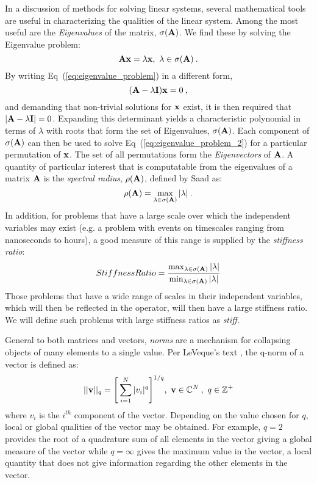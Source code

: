 In a discussion of methods for solving linear systems, several
mathematical tools are useful in characterizing the qualities of the
linear system. Among the most useful are the \textit{Eigenvalues} of
the matrix, $\sigma(\mathbf{A})$. We find these by solving the Eigenvalue
problem:
\begin{equation}
  \mathbf{A} \mathbf{x} = \lambda \mathbf{x},\ \lambda \in \sigma(\mathbf{A})\:.
  \label{eq:eigenvalue_problem}
\end{equation}
By writing Eq~(\ref{eq:eigenvalue_problem}) in a different form,
\begin{equation}
  (\mathbf{A} - \lambda \mathbf{I})\mathbf{x} = 0 \:,
  \label{eq:eigenvalue_problem_2}
\end{equation}
and demanding that non-trivial solutions for $\mathbf{x}$ exist, it is
then required that $|\mathbf{A} - \lambda \mathbf{I}| = 0$. Expanding this
determinant yields a characteristic polynomial in terms of $\lambda$
with roots that form the set of Eigenvalues, $\sigma(\mathbf{A})$. Each
component of $\sigma(\mathbf{A})$ can then be used to solve
Eq~(\ref{eq:eigenvalue_problem_2}) for a particular permutation of
$\mathbf{x}$. The set of all permutations form the \textit{Eigenvectors}
of $\mathbf{A}$. A quantity of particular interest that is computatable
from the eigenvalues of a matrix $\mathbf{A}$ is the \textit{spectral
  radius}, $\rho(\mathbf{A})$, defined by Saad \citep{saad_iterative_2003}
as:
\begin{equation}
  \rho(\mathbf{A}) = \max_{\lambda \in \sigma(\mathbf{A})} |\lambda| \:.
  \label{eq:spectral_radius}
\end{equation}
In addition, for problems that have a large scale over which the
independent variables may exist (e.g. a problem with events on
timescales ranging from nanoseconds to hours), a good measure of this
range is supplied by the \textit{stiffness ratio}:
\begin{equation}
  Stiffness Ratio = \frac{\max_{\lambda \in \sigma(\mathbf{A})}
    |\lambda|}{\min_{\lambda \in \sigma(\mathbf{A})} |\lambda|}
\end{equation}
Those problems that have a wide range of scales in their independent
variables, which will then be reflected in the operator, will then
have a large stiffness ratio. We will define such problems with large
stiffness ratios as \textit{stiff}.

General to both matrices and vectors, \textit{norms} are a mechanism
for collapsing objects of many elements to a single value. Per
LeVeque's text \citep{leveque_finite_2007}, the q-norm of a vector is defined
as:
\begin{equation}
  ||\mathbf{v}||_q = \Bigg[ \sum_{i=1}^N |v_i|^q \Bigg]^{1/q},\ \mathbf{v} \in
  \mathbb{C}^N\:,\ q \in \mathbb{Z}^+
  \label{eq:q_norm}
\end{equation}
where ${v_i}$ is the $i^{th}$ component of the vector. Depending on
the value chosen for $q$, local or global qualities of the vector may
be obtained. For example, $q=2$ provides the root of a quadrature sum
of all elements in the vector giving a global measure of the vector
while $q=\infty$ gives the maximum value in the vector, a local
quantity that does not give information regarding the other elements
in the vector.

